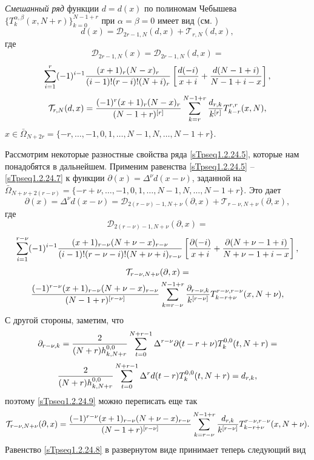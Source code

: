 \textit{Смешанный ряд} функции $d=d(x)$ по полиномам  Чебышева
$\{T_k^{\alpha,\beta}(x,N+r)\}_{k=0}^{N-1+r}$ при $\alpha=\beta=0$
имеет вид (см. \cite{idprmapproxYn, idprmapproxByCheb, idprmgreenBook})
\begin{equation}\label{sTpseq1.2.24.5}
 d(x)= \mathcal{D}_{2r-1,N}(d,x)+\mathcal{T}_{r,N}(d,x),
\end{equation}
 где
  $$\mathcal{D}_{2r-1,N}(x)=\mathcal{D}_{2r-1,N}(d,x)=
$$
\begin{equation}\label{sTpseq1.2.24.6}
\sum_{i=1}^r(-1)^{i-1}{(x+1)_r(N-x)_r\over
(i-1)!(r-i)!(N+i)_r}\left[{d(-i)\over x+i}+{d(N-1+i)\over
N-1+i-x}\right],
\end{equation}
\begin{equation}
\label{sTpseq1.2.24.7}
\mathcal{T}_{r,N}(d,x)= {(-1)^r
(x+1)_r(N-x)_r\over (N-1+r)^{[r]}} \sum_{k=r}^{N-1+r} {d_{r,k}\over
k^{[r]}}T_{k-r}^{r,r}(x,N),
\end{equation}
$x\in\bar\Omega_{N+2r}=\{-r,\ldots,-1,0,1,\ldots,N-1,N,\ldots,N-1+r\}$.

Рассмотрим некоторые разностные свойства ряда \eqref{sTpseq1.2.24.5}, которые нам
понадобятся в дальнейшем. Применим равенства \eqref{sTpseq1.2.24.5} -- \eqref{sTpseq1.2.24.7} к функции
$\partial(x)=\Delta^\nu d(x-\nu)$, заданной на $\bar\Omega_{N+\nu+2(r-\nu)}=
\{-r+\nu,\ldots,-1,0,1,\ldots,N-1,N,\ldots,N-1+r\}$. Это дает
\begin{equation}
\label{sTpseq1.2.24.8}
\partial(x)=\Delta^\nu d(x-\nu)= \mathcal{D}_{2(r-\nu)-1,N+\nu}(\partial,x)+\mathcal{T}_{r-\nu,N+\nu}(\partial,x),
\end{equation}
где
$$
\mathcal{D}_{2(r-\nu)-1,N+\nu}(\partial,x)=
$$
\begin{equation}
\label{sTpseq1.2.24.9}
\sum_{i=1}^{r-\nu}(-1)^{i-1}{(x+1)_{r-\nu}(N+\nu-x)_{r-\nu}\over
(i-1)!(r-\nu-i)!(N+\nu+i)_{r-\nu}}\left[{\partial(-i)\over
x+i}+{\partial(N+\nu-1+i)\over N+\nu-1+i-x}\right],
\end{equation}
\begin{multline}
\label{sTpseq1.2.24.10}
\mathcal{T}_{r-\nu,N+\nu}(\partial,x)=\\
{(-1)^{r-\nu}
(x+1)_{r-\nu}(N+\nu-x)_{r-\nu}\over (N-1+r)^{[r-\nu]}}
\sum_{k=r-\nu}^{N-1+r} {\partial_{r-\nu,k}\over  k^{[r-\nu]} }
T_{k-r+\nu}^{r-\nu,r-\nu}(x,N+\nu),
\end{multline}
С другой стороны, заметим, что
$$
\partial_{r-\nu,k}=
{2\over (N+r)h_{k,N+r}^{0,0}}\sum_{t=0}^{N+r-1}\Delta^{r-\nu}\partial(t-r+\nu)T^{0,0}_k(t,N+r)=
$$
\begin{equation}\label{sTpseq1.2.24.11}
{2\over (N+r)h_{k,N+r}^{0,0}}\sum_{t=0}^{N+r-1}\Delta^rd(t-r)T^{0,0}_k(t,N+r)=d_{r,k},
\end{equation}
поэтому \eqref{sTpseq1.2.24.9}  можно переписать еще так
$$\mathcal{T}_{r-\nu,N+\nu}(\partial,x)= {(-1)^{r-\nu}
(x+1)_{r-\nu}(N+\nu-x)_{r-\nu}\over (N-1+r)^{[r-\nu]}}
\sum_{k=r-\nu}^{N-1+r} {d_{r,k}\over k^{[r-\nu]}}
T_{k-r+\nu}^{r-\nu,r-\nu}(x,N+\nu).
$$
Равенство \eqref{sTpseq1.2.24.8} в развернутом виде принимает теперь следующий вид

